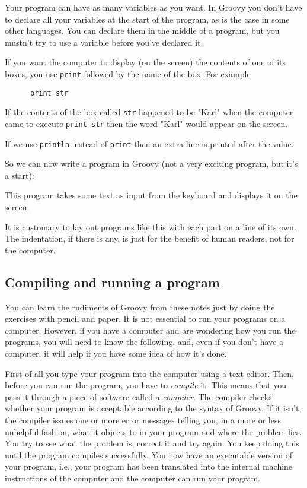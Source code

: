 Your program can have as many variables as you want.  In Groovy you don't
have to declare all your variables at the start of the program, as is the
case in some other languages.  You can declare them in the middle of a
program, but you mustn't try to use a variable before you've declared it.

If you want the computer to display (on the screen) the contents of one of
its boxes, you use \verb!print! followed by the name
of the box.  For example

\begin{Verbatim}
      print str
\end{Verbatim}

If the contents of the box called \verb!str! happened to be "Karl" when the
computer came to execute \verb!print str! then the word "Karl" would appear
on the screen.  

If we use \verb!println! instead of \verb!print! then an extra line is
printed after the value. 

So we can now write a program in Groovy (not a very exciting program,
but it's a start):


This program takes some text as input from the keyboard and displays it
on the screen.

It is customary to lay out programs like this with each part on a line 
of its own. The indentation, if there is any, is just for the benefit
of human readers, not for the computer.

\subsection{Compiling and running a program}

You can learn the rudiments of Groovy from these notes just by doing the
exercises with pencil and paper.  It is not essential to run your programs
on a computer.  However, if you have a computer and are wondering how
you run the programs, you will need to know the following, and, even if you don't have
a computer, it will help if you have some idea of how it's done.

First of all you type your program into the computer using a text
editor. Then, 
before you can run the program, you have to \emph{compile} it.  This means that
you pass it through a piece
of software called a \emph{compiler}.  The compiler checks whether your program
is acceptable according to the syntax of Groovy.  If it isn't, the compiler
issues one or more error messages telling you, in a more or less unhelpful
fashion, what it objects to in your program and where the problem lies.
You try to see what the problem is, correct it and try again.  You keep
doing this until the program compiles successfully.  You now have an
executable version of your program, i.e., your program has been translated
into the internal machine instructions of the computer and the computer
can run your program.


